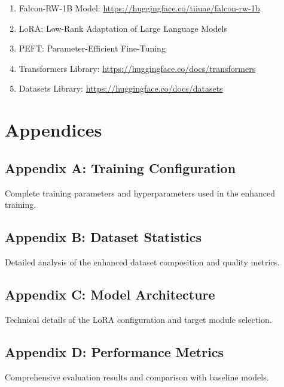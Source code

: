 \documentclass[12pt,a4paper]{article}
\begin{document}
\begin{enumerate}
    \item Falcon-RW-1B Model: \url{https://huggingface.co/tiiuae/falcon-rw-1b}
    \item LoRA: Low-Rank Adaptation of Large Language Models
    \item PEFT: Parameter-Efficient Fine-Tuning
    \item Transformers Library: \url{https://huggingface.co/docs/transformers}
    \item Datasets Library: \url{https://huggingface.co/docs/datasets}
\end{enumerate}

\section{Appendices}

\subsection{Appendix A: Training Configuration}
Complete training parameters and hyperparameters used in the enhanced training.

\subsection{Appendix B: Dataset Statistics}
Detailed analysis of the enhanced dataset composition and quality metrics.

\subsection{Appendix C: Model Architecture}
Technical details of the LoRA configuration and target module selection.

\subsection{Appendix D: Performance Metrics}
Comprehensive evaluation results and comparison with baseline models.
\end{document}
